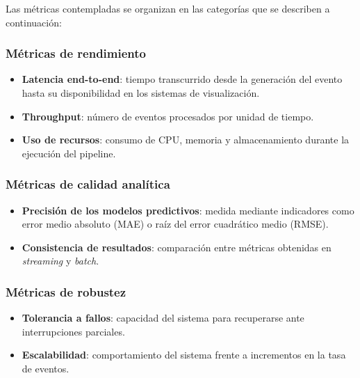 \documentclass[12pt,a4paper]{article}
\providecommand{\tightlist}{%
  \setlength{\itemsep}{0pt}\setlength{\parskip}{0pt}}
\begin{document}
Las métricas contempladas se organizan en las categorías que se describen a continuación:

\subsubsection{Métricas de rendimiento}\label{muxe9tricas-de-rendimiento}

\begin{itemize}
    \tightlist
    \item
          \textbf{Latencia end-to-end}: tiempo transcurrido desde la generación del evento hasta su disponibilidad en los sistemas de visualización.
    \item
          \textbf{Throughput}: número de eventos procesados por unidad de tiempo.
    \item
          \textbf{Uso de recursos}: consumo de CPU, memoria y almacenamiento durante la ejecución del pipeline.
\end{itemize}

\subsubsection{Métricas de calidad analítica}\label{muxe9tricas-de-calidad-analuxedtica}

\begin{itemize}
    \tightlist
    \item
          \textbf{Precisión de los modelos predictivos}: medida mediante indicadores como error medio absoluto (MAE) o raíz del error cuadrático medio (RMSE).
    \item
          \textbf{Consistencia de resultados}: comparación entre métricas obtenidas en \emph{streaming} y \emph{batch}.
\end{itemize}

\subsubsection{Métricas de robustez}\label{muxe9tricas-de-robustez}

\begin{itemize}
    \tightlist
    \item
          \textbf{Tolerancia a fallos}: capacidad del sistema para recuperarse ante interrupciones parciales.
    \item
          \textbf{Escalabilidad}: comportamiento del sistema frente a incrementos en la tasa de eventos.
\end{itemize}
\end{document}
